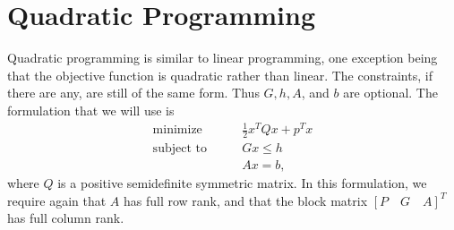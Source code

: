 \begin{comment}
>>> h = matrix([-7., -2., -4., -5., -8.,  0., 0., 0., 0., 0., 0.,])
>>> o = matrix([4., 7., 6., 8., 8., 9])
>>> sol = glpk.ilp(o,G,h)
>>> print sol[1]
\end{lstlisting}

or
\begin{lstlisting}
>>> from cvxopt import matrix, solvers, glpk
>>> G = matrix([ [-1., 0., 0., 0., 0., 0.],
             [0., -1., 0., 0., 0., 0.],
             [0., 0., -1., 0., 0., 0.],
             [0., 0., 0., -1., 0., 0.],
             [0., 0., 0., 0., -1., 0.],
             [0., 0., 0., 0., 0., -1.] ])

>>> h = matrix([ 0., 0., 0., 0., 0., 0.,])
>>> o = matrix([4., 7., 6., 8., 8., 9])
>>> A = matrix([ [1., 0., 0., 1., 0.],
             [1., 0., 0., 0., 1.],
             [0., 1., 0., 1., 0.],
             [0., 1., 0., 0., 1.],
             [0., 0., 1., 1., 0.],
             [0., 0., 1., 0., 1.] ])
>>> b = matrix([7., 2., 4., 5., 8])
>>> sol = glpk.ilp(o,G,h,A,b)
>>> print sol[1]
\end{lstlisting}

\textbf{Problem 2}
Choose one of these methods and compare the optimal values for the integer linear program to the result you received above.

\textbf{Problem 3}
Create the dual problem for the linear program and solve.
Compare your answer to the dual value cvxopt returned.
\end{comment}

\section*{Quadratic Programming}

Quadratic programming is similar to linear programming, one exception being that the objective function is quadratic rather than linear.
The constraints, if there are any, are still of the same form.
Thus $G, h, A$, and $b$ are optional. The formulation that we will use is
\begin{align*}
\text{minimize}\qquad &\frac{1}{2}x^TQx + p^Tx \\
\text{subject to}\qquad &Gx \leq h\\
 &Ax = b,
\end{align*}
where $Q$ is a positive semidefinite symmetric matrix.
In this formulation, we require again that $A$ has full row rank, and that the block matrix
$[P \quad G \quad A]^T$ has full column rank.

